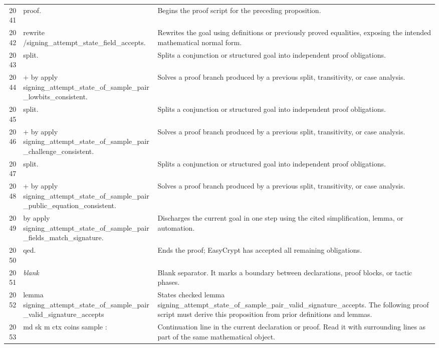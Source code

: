 \documentclass[10pt]{article}
\begin{document}
\begin{longtable}{r L{0.53\textwidth} L{0.37\textwidth}}
2041 & {\ttfamily\scriptsize proof.} & Begins the proof script for the preceding proposition. \\
2042 & {\ttfamily\scriptsize rewrite /signing\_attempt\_state\_field\_accepts.} & Rewrites the goal using definitions or previously proved equalities, exposing the intended mathematical normal form. \\
2043 & {\ttfamily\scriptsize split.} & Splits a conjunction or structured goal into independent proof obligations. \\
2044 & {\ttfamily\scriptsize + by apply signing\_attempt\_state\_of\_sample\_pair\_lowbits\_consistent.} & Solves a proof branch produced by a previous split, transitivity, or case analysis. \\
2045 & {\ttfamily\scriptsize split.} & Splits a conjunction or structured goal into independent proof obligations. \\
2046 & {\ttfamily\scriptsize + by apply signing\_attempt\_state\_of\_sample\_pair\_challenge\_consistent.} & Solves a proof branch produced by a previous split, transitivity, or case analysis. \\
2047 & {\ttfamily\scriptsize split.} & Splits a conjunction or structured goal into independent proof obligations. \\
2048 & {\ttfamily\scriptsize + by apply signing\_attempt\_state\_of\_sample\_pair\_public\_equation\_consistent.} & Solves a proof branch produced by a previous split, transitivity, or case analysis. \\
2049 & {\ttfamily\scriptsize by apply signing\_attempt\_state\_of\_sample\_pair\_fields\_match\_signature.} & Discharges the current goal in one step using the cited simplification, lemma, or automation. \\
2050 & {\ttfamily\scriptsize qed.} & Ends the proof; EasyCrypt has accepted all remaining obligations. \\
2051 & {\ttfamily\scriptsize \emph{blank}} & Blank separator.  It marks a boundary between declarations, proof blocks, or tactic phases. \\
2052 & {\ttfamily\scriptsize lemma signing\_attempt\_state\_of\_sample\_pair\_valid\_signature\_accepts} & States checked lemma signing\_attempt\_state\_of\_sample\_pair\_valid\_signature\_accepts.  The following proof script must derive this proposition from prior definitions and lemmas. \\
2053 & {\ttfamily\scriptsize    md sk m ctx coins sample :} & Continuation line in the current declaration or proof.  Read it with surrounding lines as part of the same mathematical object. \\

\end{longtable}
\end{document}

